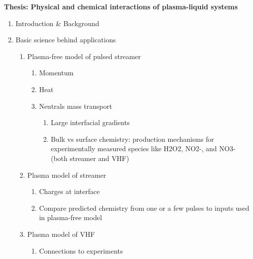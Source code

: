 \documentclass{article}
\begin{document}
\textbf{Thesis: Physical and chemical interactions of plasma-liquid systems}

\begin{enumerate}
  \item Introduction \& Background

  \item Basic science behind applications
  \begin{enumerate}
    \item Plasma-free model of pulsed streamer
    \begin{enumerate}
      \item Momentum
      \item Heat
      \item Neutrals mass transport
      \begin{enumerate}
        \item Large interfacial gradients
        \item Bulk vs surface chemistry: production mechanisms for experimentally measured species like H2O2, NO2-, and NO3- (both streamer and VHF)
      \end{enumerate}
    \end{enumerate}
    \item Plasma model of streamer
    \begin{enumerate}
      \item Charges at interface
      \item Compare predicted chemistry from one or a few pulses to inputs used in plasma-free model  
    \end{enumerate}
    \item Plasma model of VHF
    \begin{enumerate}
      \item Connections to experiments
    \end{enumerate}
  \end{enumerate}


\end{enumerate}
\end{document}
